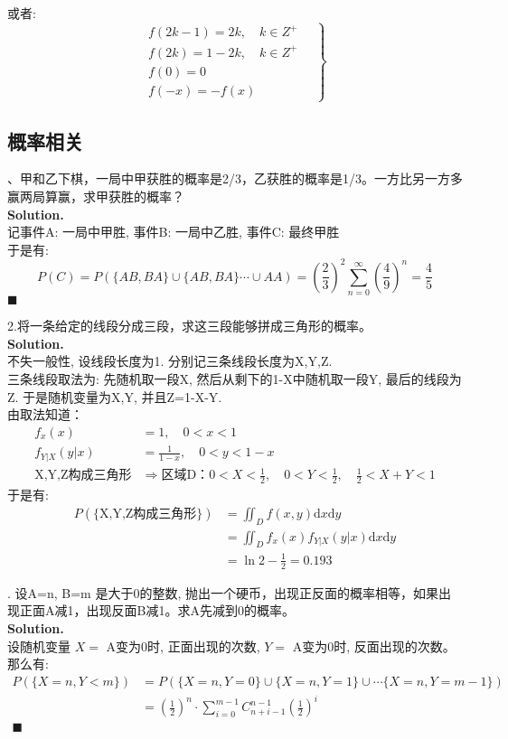 \documentclass[UTF8]{article}
\begin{document}
或者: 
$$
\left. 
\begin{aligned}
f(2k-1) = 2k , \quad k \in Z^+ \\
f(2k) = 1-2k , \quad k \in Z^+ \\
f(0) = 0 \\
f(-x) = - f(x) 
\end{aligned}
\quad \right\}
$$

\subsection{概率相关}
、甲和乙下棋，一局中甲获胜的概率是2/3，乙获胜的概率是1/3。一方比另一方多赢两局算赢，求甲获胜的概率？ \\
\noindent \textbf{Solution.} \\
记事件A: 一局中甲胜, 事件B: 一局中乙胜, 事件C: 最终甲胜\\
于是有: 
$$P(C) =P(\{AB,BA\} \cup \{AB,BA\} \cdots \cup AA) = (\frac{2}{3})^2 \sum_{n=0}^{\infty}(\frac{4}{9})^n = \frac{4}{5}$$
$\blacksquare$

\noindent 2.将一条给定的线段分成三段，求这三段能够拼成三角形的概率。 \\
\noindent \textbf{Solution.} \\
不失一般性, 设线段长度为1. 分别记三条线段长度为X,Y,Z. \\
三条线段取法为: 先随机取一段X, 然后从剩下的1-X中随机取一段Y, 最后的线段为Z. 于是随机变量为X,Y, 并且Z=1-X-Y. \\
由取法知道：
\begin{align*}
f_x(x) & = 1, \quad 0<x<1 \\
f_{Y|X}(y|x) & = \frac{1}{1-x}, \quad 0<y<1-x \\
\text{X,Y,Z构成三角形} & \Longrightarrow \text{区域D：}0<X<\frac{1}{2}, \quad 0<Y<\frac{1}{2},\quad \frac{1}{2}<X+Y<1
\end{align*}
于是有: 
\begin{align*}
P(\{\text{X,Y,Z构成三角形}\}) & = \iint_{D} f(x,y)\mathrm{d}x\mathrm{d}y  \\
 & = \iint_{D} f_x(x) f_{Y|X}(y|x) \mathrm{d}x\mathrm{d}y \\
 & = \ln2 - \frac{1}{2}= 0.193
\end{align*}

. 设A=n, B=m 是大于0的整数, 抛出一个硬币，出现正反面的概率相等，如果出现正面A减1，出现反面B减1。求A先减到0的概率。 \\
\noindent \textbf{Solution.} \\
设随机变量 $X=$ A变为0时, 正面出现的次数, $Y=$ A变为0时, 反面出现的次数。 那么有: \\
\begin{align*}
P(\{ X=n, Y<m \})  &= P(\{ X=n, Y=0 \} \cup \{ X=n, Y=1 \} \cup \cdots \{ X=n, Y=m-1 \} )   \\
&= (\frac{1}{2})^n \cdot \sum_{i=0}^{m-1} C_{n+i-1}^{n-1} (\frac{1}{2})^i  \\
\blacksquare 
\end{align*}
\end{document}
